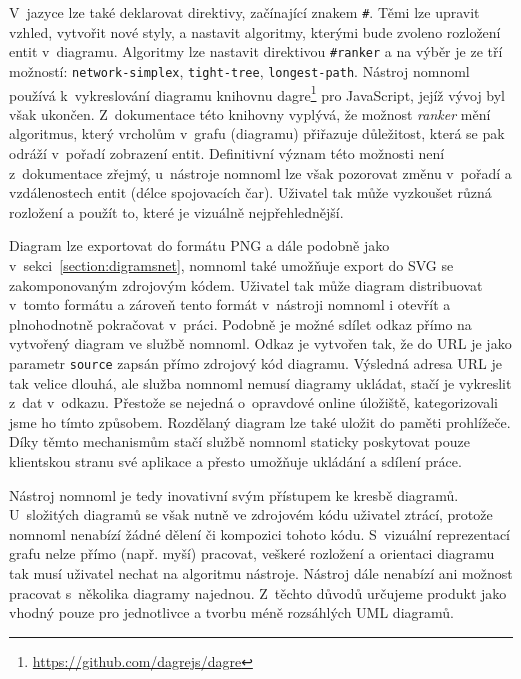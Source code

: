 V~jazyce lze také deklarovat direktivy, začínající znakem \texttt{\#}.
Těmi lze upravit vzhled, vytvořit nové styly, a nastavit algoritmy, kterými bude zvoleno rozložení entit v~diagramu.
Algoritmy lze nastavit direktivou \texttt{\#ranker} a na výběr je ze tří možností: \texttt{network-simplex}, \texttt{tight-tree}, \texttt{longest-path}.
Nástroj nomnoml používá k~vykreslování diagramu knihovnu dagre\footnote{\url{https://github.com/dagrejs/dagre}} pro JavaScript, jejíž vývoj byl však ukončen.
Z~dokumentace této knihovny vyplývá, že možnost \emph{ranker} mění algoritmus, který vrcholům v~grafu (diagramu) přiřazuje důležitost, která se pak odráží v~pořadí zobrazení entit.
Definitivní význam této možnosti není z~dokumentace zřejmý, u~nástroje nomnoml lze však pozorovat změnu v~pořadí a vzdálenostech entit (délce spojovacích čar).
Uživatel tak může vyzkoušet různá rozložení a použít to, které je vizuálně nejpřehlednější.

Diagram lze exportovat do formátu PNG a dále podobně jako v~sekci~\ref{section:digramsnet}, nomnoml také umožňuje export do SVG se zakomponovaným zdrojovým kódem.
Uživatel tak může diagram distribuovat v~tomto formátu a zároveň tento formát v~nástroji nomnoml i otevřít a plnohodnotně pokračovat v~práci.
Podobně je možné sdílet odkaz přímo na vytvořený diagram ve službě nomnoml.
Odkaz je vytvořen tak, že do URL je jako parametr \texttt{source} zapsán přímo zdrojový kód diagramu.
Výsledná adresa URL je tak velice dlouhá, ale služba nomnoml nemusí diagramy ukládat, stačí je vykreslit z~dat v~odkazu.
Přestože se nejedná o~opravdové online úložiště, kategorizovali jsme ho tímto způsobem.
Rozdělaný diagram lze také uložit do paměti prohlížeče.
Díky těmto mechanismům stačí službě nomnoml staticky poskytovat pouze klientskou stranu své aplikace a přesto umožňuje ukládání a sdílení práce.

Nástroj nomnoml je tedy inovativní svým přístupem ke kresbě diagramů.
U~složitých diagramů se však nutně ve zdrojovém kódu uživatel ztrácí, protože nomnoml nenabízí žádné dělení či kompozici tohoto kódu.
S~vizuální reprezentací grafu nelze přímo (např. myší) pracovat, veškeré rozložení a orientaci diagramu tak musí uživatel nechat na algoritmu nástroje.
Nástroj dále nenabízí ani možnost pracovat s~několika diagramy najednou.
Z~těchto důvodů určujeme produkt jako vhodný pouze pro jednotlivce a tvorbu méně rozsáhlých UML diagramů.

